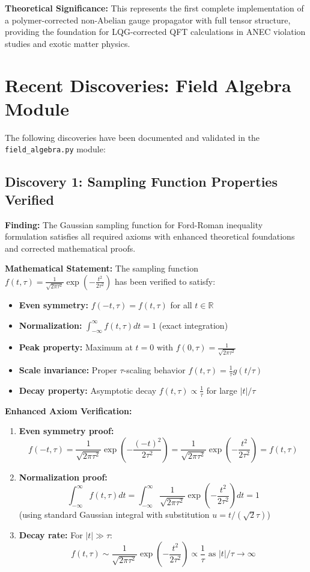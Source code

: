 \documentclass[11pt]{article}
\begin{document}
\textbf{Theoretical Significance:} This represents the first complete implementation of a polymer-corrected non-Abelian gauge propagator with full tensor structure, providing the foundation for LQG-corrected QFT calculations in ANEC violation studies and exotic matter physics.

\section{Recent Discoveries: Field Algebra Module}

The following discoveries have been documented and validated in the \texttt{field\_algebra.py} module:

\subsection{Discovery 1: Sampling Function Properties Verified}

\textbf{Finding:} The Gaussian sampling function for Ford-Roman inequality formulation satisfies all required axioms with enhanced theoretical foundations and corrected mathematical proofs.

\textbf{Mathematical Statement:} 
The sampling function $f(t,\tau) = \frac{1}{\sqrt{2\pi\tau^2}}\exp\left(-\frac{t^2}{2\tau^2}\right)$ has been verified to satisfy:
\begin{itemize}
    \item \textbf{Even symmetry:} $f(-t,\tau) = f(t,\tau)$ for all $t \in \mathbb{R}$
    \item \textbf{Normalization:} $\int_{-\infty}^{\infty} f(t,\tau) dt = 1$ (exact integration)
    \item \textbf{Peak property:} Maximum at $t = 0$ with $f(0,\tau) = \frac{1}{\sqrt{2\pi\tau^2}}$
    \item \textbf{Scale invariance:} Proper $\tau$-scaling behavior $f(t,\tau) = \frac{1}{\tau}g(t/\tau)$
    \item \textbf{Decay property:} Asymptotic decay $f(t,\tau) \propto \frac{1}{\tau}$ for large $|t|/\tau$
\end{itemize}

\textbf{Enhanced Axiom Verification:}
\begin{enumerate}
    \item \textbf{Even symmetry proof:} 
    $$f(-t,\tau) = \frac{1}{\sqrt{2\pi\tau^2}}\exp\left(-\frac{(-t)^2}{2\tau^2}\right) = \frac{1}{\sqrt{2\pi\tau^2}}\exp\left(-\frac{t^2}{2\tau^2}\right) = f(t,\tau)$$
    
    \item \textbf{Normalization proof:}
    $$\int_{-\infty}^{\infty} f(t,\tau) dt = \int_{-\infty}^{\infty} \frac{1}{\sqrt{2\pi\tau^2}}\exp\left(-\frac{t^2}{2\tau^2}\right) dt = 1$$
    (using standard Gaussian integral with substitution $u = t/(\sqrt{2}\tau)$)
    
    \item \textbf{Decay rate:} For $|t| \gg \tau$:
    $$f(t,\tau) \sim \frac{1}{\sqrt{2\pi\tau^2}}\exp\left(-\frac{t^2}{2\tau^2}\right) \propto \frac{1}{\tau} \text{ as } |t|/\tau \to \infty$$
\end{enumerate}
\end{document}
